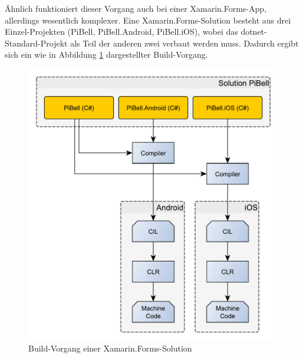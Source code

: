 Ähnlich funktioniert dieser Vorgang auch bei einer Xamarin.Forms-App, allerdings wesentlich komplexer.
Eine Xamarin.Forms-Solution besteht aus drei Einzel-Projekten (PiBell, PiBell.Android, PiBell.iOS), wobei das \ac{dotnet}-Standard-Projekt als Teil der anderen zwei verbaut werden muss.
Dadurch ergibt sich ein wie in Abbildung \ref{fig:build-forms} dargestellter Build-Vorgang.
\begin{figure}[htbp!]
    \centering\includegraphics[width=0.9\linewidth]{images/auswahl_rahmenwerk/build-vorgang.pdf}
    \caption{Build-Vorgang einer Xamarin.Forms-Solution}
    \label{fig:build-forms}
\end{figure}

